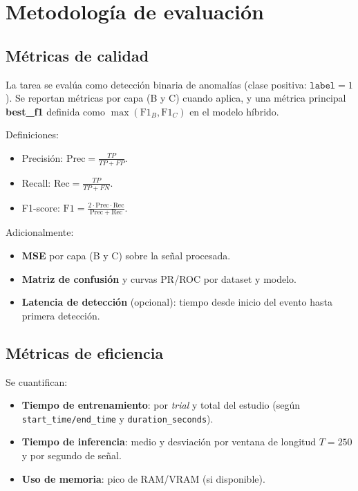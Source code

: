 \section{Metodología de evaluación}

\subsection{Métricas de calidad}
La tarea se evalúa como detección binaria de anomalías (clase positiva: \(\texttt{label} = 1\)). Se reportan métricas por capa (B y C) cuando aplica, y una métrica principal \textbf{best\_f1} definida como \(\max(\text{F1}_B, \text{F1}_C)\) en el modelo híbrido.

Definiciones:
\begin{itemize}
    \item Precisión: \(\mathrm{Prec} = \frac{TP}{TP + FP}\).
    \item Recall: \(\mathrm{Rec} = \frac{TP}{TP + FN}\).
    \item F1-score: \(\mathrm{F1} = \frac{2 \cdot \mathrm{Prec} \cdot \mathrm{Rec}}{\mathrm{Prec} + \mathrm{Rec}}\).
\end{itemize}

Adicionalmente:
\begin{itemize}
    \item \textbf{MSE} por capa (B y C) sobre la señal procesada.
    \item \textbf{Matriz de confusión} y curvas PR/ROC por dataset y modelo.
    \item \textbf{Latencia de detección} (opcional): tiempo desde inicio del evento hasta primera detección.
\end{itemize}

\subsection{Métricas de eficiencia}
Se cuantifican:
\begin{itemize}
    \item \textbf{Tiempo de entrenamiento}: por \textit{trial} y total del estudio (según \texttt{start\_time/end\_time} y \texttt{duration\_seconds}).
    \item \textbf{Tiempo de inferencia}: medio y desviación por ventana de longitud \(T=250\) y por segundo de señal.
    \item \textbf{Uso de memoria}: pico de RAM/VRAM (si disponible).
\end{itemize}

